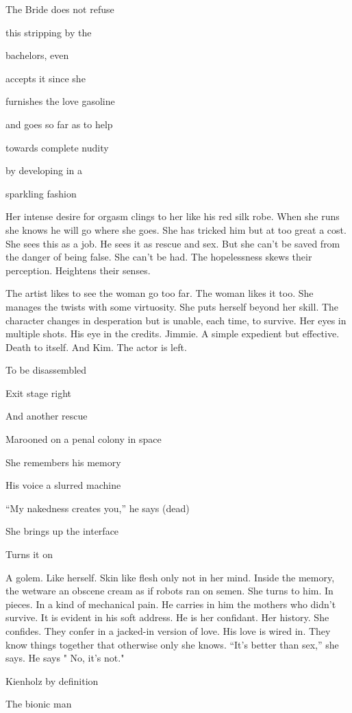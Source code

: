 \documentclass[
]{memoir}
\begin{document}
The Bride does not refuse

this stripping by the

bachelors, even

accepts it since she

furnishes the love gasoline

and goes so far as to help

towards complete nudity

by developing in a

sparkling fashion

Her intense desire for orgasm clings to her like his red silk robe. When
she runs she knows he will go where she goes. She has tricked him but at
too great a cost. She sees this as a job. He sees it as rescue and sex.
But she can't be saved from the danger of being false. She can't be had.
The hopelessness skews their perception. Heightens their senses.

The artist likes to see the woman go too far. The woman likes it too.
She manages the twists with some virtuosity. She puts herself beyond her
skill. The character changes in desperation but is unable, each time, to
survive. Her eyes in multiple shots. His eye in the credits. Jimmie. A
simple expedient but effective. Death to itself. And Kim. The actor is
left.

To be disassembled

Exit stage right

And another rescue

Marooned on a penal colony in space

She remembers his memory

His voice a slurred machine

``My nakedness creates you,'' he says (dead)

She brings up the interface

Turns it on

A golem. Like herself. Skin like flesh only not in her mind. Inside the
memory, the wetware an obscene cream as if robots ran on semen. She
turns to him. In pieces. In a kind of mechanical pain. He carries in him
the mothers who didn't survive. It is evident in his soft address. He is
her confidant. Her history. She confides. They confer in a jacked-in
version of love. His love is wired in. They know things together that
otherwise only she knows. ``It's better than sex,'' she says. He says "
No, it's not."

Kienholz by definition

The bionic man
\end{document}
